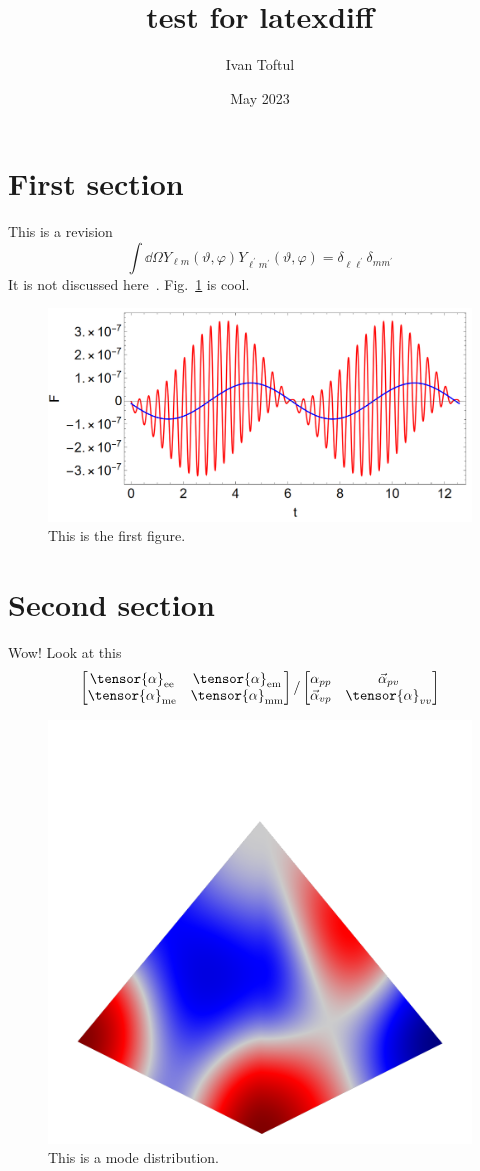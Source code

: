 \documentclass{revtex4-2}
\begin{document}
\title{test for latexdiff}
\author{Ivan Toftul}
\date{May 2023}

\maketitle

\section{First section}

This is a revision
\begin{equation}
    \int \dd \Omega Y_{\ell m} (\vartheta, \varphi) Y_{\ell^{\prime} m^{\prime}} (\vartheta, \varphi) = \delta_{\ell \ell^{\prime}} \delta_{m m^{\prime}}
\end{equation}
It is not discussed here~\cite{Toftul2019Oct}. Fig.~\ref{fig:figure1} is cool.

\begin{figure}
    \centering
    \includegraphics[width=0.7\linewidth]{fig/image.png}
    \caption{This is the first figure.}
    \label{fig:figure1}
\end{figure}

\section{Second section}

Wow! Look at this
\begin{equation}
    \begin{bmatrix}
\tensor{\alpha}_{\text{ee}} & \tensor{\alpha}_{\text{em}} \\
\tensor{\alpha}_{\text{me}} & \tensor{\alpha}_{\text{mm}} 
\end{bmatrix} / \begin{bmatrix}
\alpha_{pp} & \vec{\alpha}_{pv} \\
\vec{\alpha}_{vp} & \tensor{\alpha}_{vv} 
\end{bmatrix}
\end{equation}

\begin{figure}
    \centering
    \includegraphics[width=0.3\linewidth]{fig/E_2_2.png}
    \caption{This is a mode distribution.}
    \label{fig:mode}
\end{figure}


\end{document}
